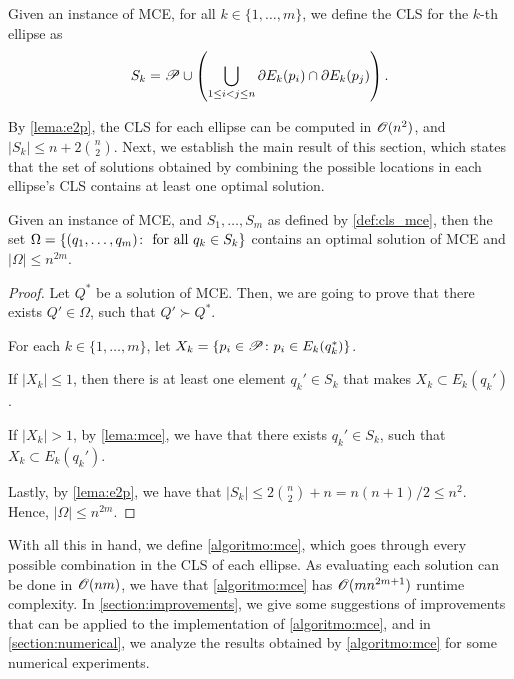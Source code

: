 \begin{definition}\label{def:cls_mce}
	Given an instance of MCE, for all $k \in \{1, \dots, m\}$, we define the CLS for the $k$-th ellipse as
	\begin{equation}
	S_k = \mathscr{P} \cup \left(\bigcup_{1 \le i < j \le n} \partial E_k(p_i) \cap \partial E_k(p_j) \right).
	\end{equation}
\end{definition}

By \autoref{lema:e2p}, the CLS for each ellipse can be computed in $\mathscr{O}(n^2)$, and $|S_k| \le n + 2\binom{n}{2}$. Next, we establish the main result of this section, which states that the set of solutions obtained by combining the possible locations in each ellipse's CLS contains at least one optimal solution.

\begin{thm}\label{thm:mce}
	Given an instance of MCE, and $S_1, \dots, S_m$ as defined by \autoref{def:cls_mce}, then the set $\Omega = \{(q_1, \dots, q_m) \colon \textnormal{ for all }q_k \in S_k \}$ contains an optimal solution of MCE and $|\Omega| \le n^{2m}$. 
\end{thm}
\begin{proof}
	Let $Q^*$ be a solution of MCE. Then, we are going to prove that there exists $Q' \in \Omega$, such that $Q'\succ Q^*$.
	
	For each $k\in \{1, \dots, m\}$, let $X_k = \{p_i \in \mathscr{P}\colon p_i \in E_k(q_k^*)\}$.
	
	
	If $|X_k| \le 1$, then there is at least one element $q_k'\in S_k$ that makes $X_k \subset E_k(q_k')$.
	
	If $|X_k| > 1$, by \autoref{lema:mce}, we have that there exists $q_k' \in S_k$, such that $X_k \subset E_k(q_k')$.
		
	Lastly, by \autoref{lema:e2p}, we have that $|S_k| \le 2\binom{n}{2} + n = n(n+1)/2 \le n^2$. Hence, $|\Omega| \le n^{2m}$.
\end{proof}

With all this in hand, we define \autoref{algoritmo:mce}, which goes through every possible combination in the CLS of each ellipse. As evaluating each solution can be done in $\mathscr{O}(nm)$, we have that \autoref{algoritmo:mce} has $\mathscr{O}(mn^{2m+1})$ runtime complexity. 
In \autoref{section:improvements}, we give some suggestions of improvements that can be applied to the implementation of \autoref{algoritmo:mce}, and in \autoref{section:numerical}, we analyze the results obtained by \autoref{algoritmo:mce} for some numerical experiments.

